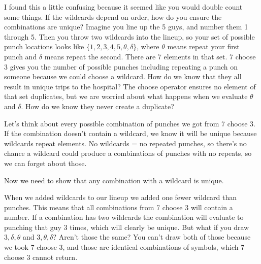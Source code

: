 \documentclass{article}
\begin{document}
    I found this a little confusing because it seemed like you would double count some things.
    If the wildcards depend on order, how do you ensure the combinations are unique?
    Imagine you line up the 5 guys, and number them 1 through 5.
    Then you throw two wildcards into the lineup, so your set of possible punch locations looks like $\{ 1, 2, 3, 4, 5, \theta, \delta \}$, 
    where $\theta$ means repeat your first punch and $\delta$ means repeat the second.
    There are 7 elements in that set.
    7 choose 3 gives you the number of possible punches including repeating a punch on someone because we could choose a wildcard.
    How do we know that they all result in unique trips to the hospital?
    The choose operator ensures no element of that set duplicates, but we are worried about what happens when we evaluate $\theta$ and $\delta$.
    How do we know they never create a duplicate?

    Let's think about every possible combination of punches we got from 7 choose 3.
    If the combination doesn't contain a wildcard, we know it will be unique because wildcards repeat elements.
    No wildcards = no repeated punches, so there's no chance a wildcard could produce a combinations of punches with no repeats, so we can forget about those.

    Now we need to show that any combination with a wildcard is unique.

    When we added wildcards to our lineup we added one fewer wildcard than punches.
    This means that all combinations from 7 choose 3 will contain a number.
    If a combination has two wildcards the combination will evaluate to punching that guy 3 times, which will clearly be unique.
    But what if you draw $3, \delta, \theta$ and $3, \theta, \delta$? 
    Aren't those the same?
    You can't draw both of those because we took 7 choose 3, and those are identical combinations of symbols, which 7 choose 3 cannot return.
    
\end{document}
